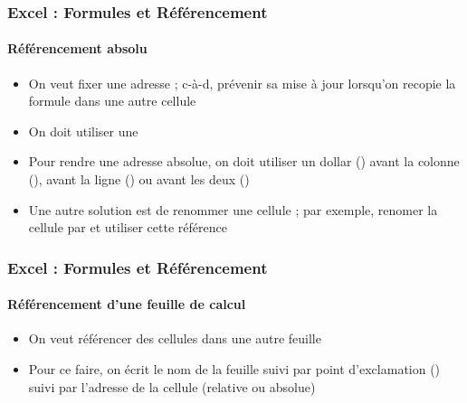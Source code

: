 \documentclass[xcolor=table, usenames,dvipsnames]{beamer}
\begin{document}
\begin{frame}
\frametitle{Excel : Formules et Référencement}
\framesubtitle{Référencement absolu}

\begin{minipage}{0.40\textwidth}
	\begin{itemize}
		\item On veut fixer une adresse ; c-à-d, prévenir sa mise à jour lorsqu'on recopie la formule dans une autre cellule
	\end{itemize}
\end{minipage}
%
\begin{minipage}{0.59\textwidth}
\end{minipage}

\begin{itemize}
	\item On doit utiliser une 
	\item Pour rendre une adresse absolue, on doit utiliser un dollar (\keyword{\$}) avant la colonne (), avant la ligne () ou avant les deux ()
	\item Une autre solution est de renommer une cellule ; par exemple, renomer la cellule  par  et utiliser cette référence
\end{itemize}

\end{frame}

\begin{frame}
\frametitle{Excel : Formules et Référencement}
\framesubtitle{Référencement d'une feuille de calcul}

\begin{minipage}{0.40\textwidth}
	\begin{itemize}
		\item On veut référencer des cellules dans une autre feuille
		\item Pour ce faire, on écrit le nom de la feuille suivi par point d'exclamation (\keyword{!}) suivi par l'adresse de la cellule (relative ou absolue)
	\end{itemize}
\end{minipage}
%
\begin{minipage}{0.59\textwidth}
\end{minipage}

\end{frame}
\end{document}
